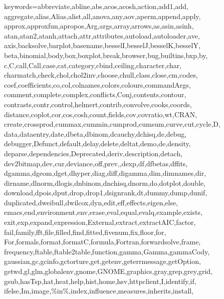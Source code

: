 \def\zz{\ifx\[$\else\aftergroup\zzz\fi}
\def\zzz{\setbox0\lastbox
\dimen0\dimexpr\extrarowheight + \ht0-\dp0\relax
\setbox0\hbox{\raise-.5\dimen0\box0}%
\ht0=\dimexpr\ht0+\extrarowheight\relax
\dp0=\dimexpr\dp0+\extrarowheight\relax 
\box0
}



%
{keywords={abbreviate,abline,abs,acos,acosh,action,add1,add,%
        aggregate,alias,Alias,alist,all,anova,any,aov,aperm,append,apply,%
        approx,approxfun,apropos,Arg,args,array,arrows,as,asin,asinh,%
        atan,atan2,atanh,attach,attr,attributes,autoload,autoloader,ave,%
        axis,backsolve,barplot,basename,besselI,besselJ,besselK,besselY,%
        beta,binomial,body,box,boxplot,break,browser,bug,builtins,bxp,by,%
        c,C,call,Call,case,cat,category,cbind,ceiling,character,char,%
        charmatch,check,chol,chol2inv,choose,chull,class,close,cm,codes,%
        coef,coefficients,co,col,colnames,colors,colours,commandArgs,%
        comment,complete,complex,conflicts,Conj,contents,contour,%
        contrasts,contr,control,helmert,contrib,convolve,cooks,coords,%
        distance,coplot,cor,cos,cosh,count,fields,cov,covratio,wt,CRAN,%
        create,crossprod,cummax,cummin,cumprod,cumsum,curve,cut,cycle,D,%
        data,dataentry,date,dbeta,dbinom,dcauchy,dchisq,de,debug,%
        debugger,Defunct,default,delay,delete,deltat,demo,de,density,%
        deparse,dependencies,Deprecated,deriv,description,detach,%
        dev2bitmap,dev,cur,deviance,off,prev,,dexp,df,dfbetas,dffits,%
        dgamma,dgeom,dget,dhyper,diag,diff,digamma,dim,dimnames,dir,%
        dirname,dlnorm,dlogis,dnbinom,dnchisq,dnorm,do,dotplot,double,%
        download,dpois,dput,drop,drop1,dsignrank,dt,dummy,dump,dunif,%
        duplicated,dweibull,dwilcox,dyn,edit,eff,effects,eigen,else,%
        emacs,end,environment,env,erase,eval,equal,evalq,example,exists,%
        exit,exp,expand,expression,External,extract,extractAIC,factor,%
        fail,family,fft,file,filled,find,fitted,fivenum,fix,floor,for,%
        For,formals,format,formatC,formula,Fortran,forwardsolve,frame,%
        frequency,ftable,ftable2table,function,gamma,Gamma,gammaCody,%
        gaussian,gc,gcinfo,gctorture,get,getenv,geterrmessage,getOption,%
        getwd,gl,glm,globalenv,gnome,GNOME,graphics,gray,grep,grey,grid,%
        gsub,hasTsp,hat,heat,help,hist,home,hsv,httpclient,I,identify,if,%
        ifelse,Im,image,\%in\%,index,influence,measures,inherits,install,%
}}

